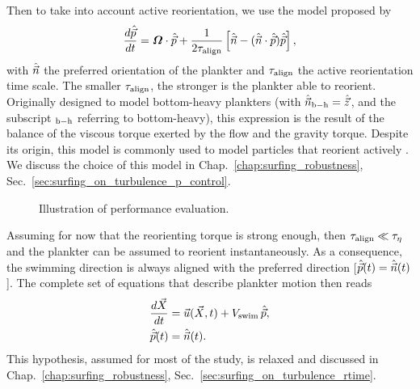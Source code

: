 Then to take into account active reorientation, we use the model proposed by \citet{Pedley1992}
\begin{equation}\label{eq:pedley_orientation}
		\frac{d \hat{\vec{p}}}{d t}  =  
		\boldsymbol{\varOmega} \cdot \hat{\vec{p}} + \frac{1}{2 \tau_{\mathrm{align}}} \left[ \hat{\vec{n}} - (\hat{\vec{n}} \cdot \hat{\vec{p}}) \hat{\vec{p}} \right],
\end{equation}
with $\hat{\vec{n}}$ the preferred orientation of the plankter and $\tau_{\mathrm{align}}$ the active reorientation time scale.
The smaller $\tau_{\mathrm{align}}$, the stronger is the plankter able to reorient.
Originally designed to model bottom-heavy plankters (with $\hat{\vec{n}}_{\mathrm{b-h}} = \hat{\vec{z}}$, and the subscript $_{\mathrm{b-h}}$ referring to bottom-heavy), this expression is the result of the balance of the viscous torque exerted by the flow and the gravity torque.
Despite its origin, this model is commonly used to model particles that reorient actively \citep{colabrese2017flow, gustavsson2017finding, lange2021sperm}.
We discuss the choice of this model in Chap.~\ref{chap:surfing_robustness}, Sec.~\ref{sec:surfing_on_turbulence_p_control}.

\begin{wrapfigure}[10]{R}[0.5\width]{0.35\textwidth}
	\centering
	\vspace{-10pt}
	\def\svgwidth{0.3\textwidth}
	
	\captionsetup{width=0.3\textwidth}
  	\caption{Illustration of performance evaluation.}
  	\label{fig:performance_description}
\end{wrapfigure}
Assuming for now that the reorienting torque is strong enough, then $\tau_{\mathrm{align}} \ll \tau_{\eta}$ and the plankter can be assumed to reorient instantaneously.
As a consequence, the swimming direction is always aligned with the preferred direction [$\hat{\vec{p}}(t) = \hat{\vec{n}}(t)$].
The complete set of equations that describe plankter motion then reads
\begin{subequations}\label{eq:surfing_motion}
	\begin{align}
		\frac{d \vec{X}}{dt} &= \vec{u} (\vec{X}, t) + V_{\mathrm{swim}} \, \hat{\vec{p}}, \\
		\hat{\vec{p}}(t) &= \hat{\vec{n}}(t).
	\end{align}
\end{subequations}
This hypothesis, assumed for most of the study, is relaxed and discussed in Chap.~\ref{chap:surfing_robustness}, Sec.~\ref{sec:surfing_on_turbulence_rtime}.

